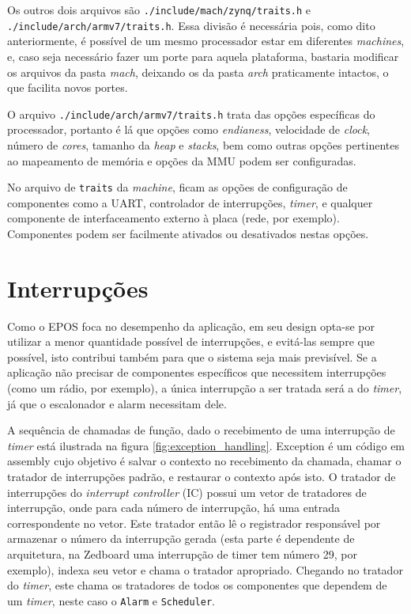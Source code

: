 Os outros dois arquivos são \verb+./include/mach/zynq/traits.h+ e\\ \verb+./include/arch/armv7/traits.h+. Essa divisão é necessária pois, como dito anteriormente, é possível de um mesmo processador estar em diferentes \emph{machines}, e, caso seja necessário fazer um porte para aquela plataforma, bastaria modificar os arquivos da pasta \emph{mach}, deixando os da pasta \emph{arch} praticamente intactos, o que facilita novos portes.

O arquivo \verb+./include/arch/armv7/traits.h+ trata das opções específicas do processador, portanto é lá que opções como \emph{endianess}, velocidade de \emph{clock}, número de \emph{cores}, tamanho da \emph{heap} e \emph{stacks}, bem como outras opções pertinentes ao mapeamento de memória e opções da MMU podem ser configuradas.

No arquivo de \verb=traits= da \emph{machine}, ficam as opções de configuração de componentes como a UART, controlador de interrupções, \emph{timer}, e qualquer componente de interfaceamento externo à placa (rede, por exemplo). Componentes podem ser facilmente ativados ou desativados nestas opções.

\section{Interrupções}


Como o EPOS foca no desempenho da aplicação, em seu design opta-se por utilizar a menor quantidade possível de interrupções, e evitá-las sempre que possível, isto contribui também para que o sistema seja mais previsível. Se a aplicação não precisar de componentes específicos que necessitem interrupções (como um rádio, por exemplo), a única interrupção a ser tratada será a do \emph{timer}, já que o escalonador e alarm necessitam dele.


A sequência de chamadas de função, dado o recebimento de uma interrupção de \emph{timer} está ilustrada na figura \ref{fig:exception_handling}. Exception é um código em assembly cujo objetivo é salvar o contexto no recebimento da chamada, chamar o tratador de interrupções padrão, e restaurar o contexto após isto. O tratador de interrupções do \emph{interrupt controller} (IC) possui um vetor de tratadores de interrupção, onde para cada número de interrupção, há uma entrada correspondente no vetor. Este tratador então lê o registrador responsável por armazenar o número da interrupção gerada (esta parte é dependente de arquitetura, na Zedboard uma interrupção de timer tem número 29, por exemplo), indexa seu vetor e chama o tratador apropriado. Chegando no tratador do \emph{timer}, este chama os tratadores de todos os componentes que dependem de um \emph{timer}, neste caso o \verb+Alarm+ e \verb+Scheduler+.

